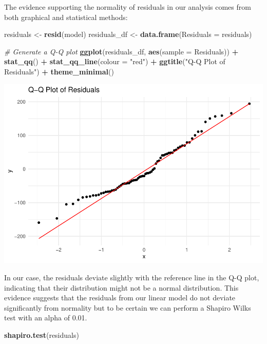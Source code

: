 \documentclass[
]{article}
\newenvironment{Shaded}{\begin{snugshade}}{\end{snugshade}}
\newcommand{\AttributeTok}[1]{\textcolor[rgb]{0.13,0.29,0.53}{#1}}
\newcommand{\CommentTok}[1]{\textcolor[rgb]{0.56,0.35,0.01}{\textit{#1}}}
\newcommand{\FunctionTok}[1]{\textcolor[rgb]{0.13,0.29,0.53}{\textbf{#1}}}
\newcommand{\NormalTok}[1]{#1}
\newcommand{\OtherTok}[1]{\textcolor[rgb]{0.56,0.35,0.01}{#1}}
\newcommand{\SpecialCharTok}[1]{\textcolor[rgb]{0.81,0.36,0.00}{\textbf{#1}}}
\newcommand{\StringTok}[1]{\textcolor[rgb]{0.31,0.60,0.02}{#1}}
\begin{document}
The evidence supporting the normality of residuals in our analysis comes
from both graphical and statistical methods:

\begin{Shaded}
\begin{Highlighting}[]
\NormalTok{residuals }\OtherTok{\textless{}{-}} \FunctionTok{resid}\NormalTok{(model)}
\NormalTok{residuals\_df }\OtherTok{\textless{}{-}} \FunctionTok{data.frame}\NormalTok{(}\AttributeTok{Residuals =}\NormalTok{ residuals)}

\CommentTok{\# Generate a Q{-}Q plot}
\FunctionTok{ggplot}\NormalTok{(residuals\_df, }\FunctionTok{aes}\NormalTok{(}\AttributeTok{sample =}\NormalTok{ Residuals)) }\SpecialCharTok{+}
  \FunctionTok{stat\_qq}\NormalTok{() }\SpecialCharTok{+}
  \FunctionTok{stat\_qq\_line}\NormalTok{(}\AttributeTok{colour =} \StringTok{"red"}\NormalTok{) }\SpecialCharTok{+}
  \FunctionTok{ggtitle}\NormalTok{(}\StringTok{"Q{-}Q Plot of Residuals"}\NormalTok{) }\SpecialCharTok{+}
  \FunctionTok{theme\_minimal}\NormalTok{()}
\end{Highlighting}
\end{Shaded}

\includegraphics{602_project_files/figure-latex/unnamed-chunk-22-1.pdf}

In our case, the residuals deviate slightly with the reference line in
the Q-Q plot, indicating that their distribution might not be a normal
distribution. This evidence suggests that the residuals from our linear
model do not deviate significantly from normality but to be certain we
can perform a Shapiro Wilks test with an alpha of 0.01.

\begin{Shaded}
\begin{Highlighting}[]
\FunctionTok{shapiro.test}\NormalTok{(residuals)}
\end{Highlighting}
\end{Shaded}
\end{document}
